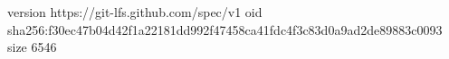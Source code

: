 version https://git-lfs.github.com/spec/v1
oid sha256:f30ec47b04d42f1a22181dd992f47458ca41fdc4f3c83d0a9ad2de89883c0093
size 6546
